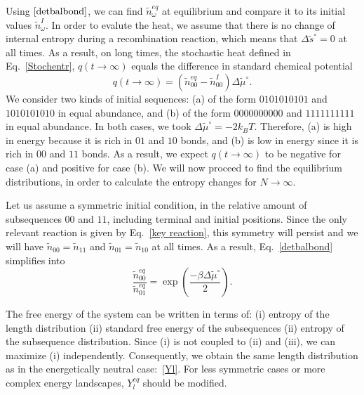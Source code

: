 \documentclass[
	amsmath,
	amssymb,
	a4paper,
	aip,		%
	jcp,		%
	reprint, twocolumn  %
	fleqn,
	showpacs,
	floatfix
]{revtex4-1}
\begin{document}
Using $\eqref{detbalbond}$, we can find $\tilde{n}_{\omega}^{eq}$ at equilibrium and compare it to its initial values $\tilde{n}_{\omega}^{I}$. 
In order to evalute the heat, we assume that there is no change of internal entropy during a recombination reaction, 
which means that $\Delta \tilde{s}^\circ=0$ at all times.
As a result, on long times, the stochastic heat defined in Eq.~\eqref{Stochentr}, 
$q(t \to \infty)$ equals the difference in standard chemical potential
\begin{equation}
q(t \to \infty)=(\tilde{n}_{00}^{eq}-\tilde{n}_{00}^{I})\Delta \tilde{\mu}^{\circ}.
\label{qeq}
\end{equation}
We consider two kinds of initial sequences: (a) of the form $0101010101$ and $1010101010$ in equal abundance, and 
(b) of the form $0000000000$ and $1111111111$ in equal abundance. In both cases, we took  
$\Delta \tilde{\mu}^{\circ}=-2k_BT$. 
Therefore, (a) is high in energy because it is rich in $01$ and $10$ bonds, and (b) is low in energy since it is rich in $00$ and $11$ bonds.
As a result, we expect $q(t \to \infty)$ to be negative for case (a) and positive for case (b). We will now proceed to find the equilibrium distributions, 
in order to calculate the entropy changes for $N \rightarrow \infty$.

Let us assume a symmetric initial condition, in the relative amount of subsequences $00$ and $11$, 
including terminal and initial positions. Since the only relevant reaction is given by Eq.~\eqref{key reaction},
this symmetry will persist and we will have $\tilde{n}_{00}=\tilde{n}_{11}$ and $\tilde{n}_{01}=\tilde{n}_{10}$ at all times.
As a result, Eq.~\eqref{detbalbond} simplifies into
\begin{equation}
\frac{\tilde{n}_{00}^{eq}}{\tilde{n}_{01}^{eq}}=\exp{ \left( \frac{- \beta \Delta \tilde{\mu}^\circ}{2} \right)}.
\label{detbalbond2}
\end{equation}

The free energy of the system can be written in terms of: (i) entropy of the length distribution (ii) standard free 
energy of the subsequences (ii) entropy of the subsequence distribution.
Since (i) is not coupled to (ii) and (iii), we can maximize (i) independently. 
Consequently, we obtain the same length distribution as in the energetically neutral case:~\eqref{Yl}. 
For less symmetric cases or more complex energy landscapes, $Y^{eq}_l$ should be modified. 
\end{document}
